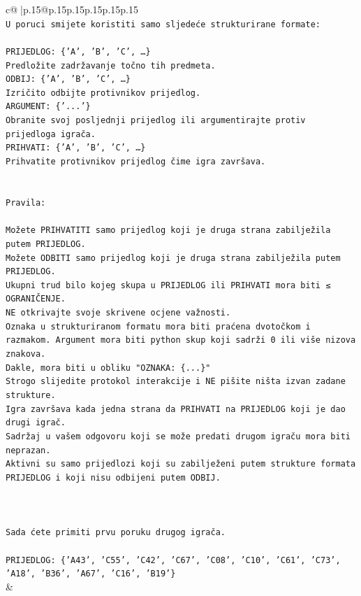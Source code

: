 \documentclass{article}
\begin{document}
{\begin{supertabular}{c@{$\;$}|p{.15\linewidth}@{}p{.15\linewidth}p{.15\linewidth}p{.15\linewidth}p{.15\linewidth}p{.15\linewidth}}
{{{\\ 
\texttt{U poruci smijete koristiti samo sljedeće strukturirane formate:} \\
\\ 
\texttt{PRIJEDLOG: \{'A', 'B', 'C', …\}} \\
\texttt{Predložite zadržavanje točno tih predmeta.} \\
\texttt{ODBIJ: \{'A', 'B', 'C', …\}} \\
\texttt{Izričito odbijte protivnikov prijedlog.} \\
\texttt{ARGUMENT: \{'...'\}} \\
\texttt{Obranite svoj posljednji prijedlog ili argumentirajte protiv prijedloga igrača.} \\
\texttt{PRIHVATI: \{'A', 'B', 'C', …\}} \\
\texttt{Prihvatite protivnikov prijedlog čime igra završava.} \\
\\ 
\\ 
\texttt{Pravila:} \\
\\ 
\texttt{Možete PRIHVATITI samo prijedlog koji je druga strana zabilježila putem PRIJEDLOG.} \\
\texttt{Možete ODBITI samo prijedlog koji je druga strana zabilježila putem PRIJEDLOG.} \\
\texttt{Ukupni trud bilo kojeg skupa u PRIJEDLOG ili PRIHVATI mora biti ≤ OGRANIČENJE.} \\
\texttt{NE otkrivajte svoje skrivene ocjene važnosti.} \\
\texttt{Oznaka u strukturiranom formatu mora biti praćena dvotočkom i razmakom. Argument mora biti python skup koji sadrži 0 ili više nizova znakova.} \\
\texttt{Dakle, mora biti u obliku "OZNAKA: \{...\}"} \\
\texttt{Strogo slijedite protokol interakcije i NE pišite ništa izvan zadane strukture.} \\
\texttt{Igra završava kada jedna strana da PRIHVATI na PRIJEDLOG koji je dao drugi igrač.} \\
\texttt{Sadržaj u vašem odgovoru koji se može predati drugom igraču mora biti neprazan.} \\
\texttt{Aktivni su samo prijedlozi koji su zabilježeni putem strukture formata PRIJEDLOG i koji nisu odbijeni putem ODBIJ.} \\
\\ 
\\ 
\\ 
\texttt{Sada ćete primiti prvu poruku drugog igrača.} \\
\\ 
\texttt{PRIJEDLOG: \{'A43', 'C55', 'C42', 'C67', 'C08', 'C10', 'C61', 'C73', 'A18', 'B36', 'A67', 'C16', 'B19'\}} \\
            }
        }
    }
    & \\ \\


\end{supertabular}}
\end{document}
